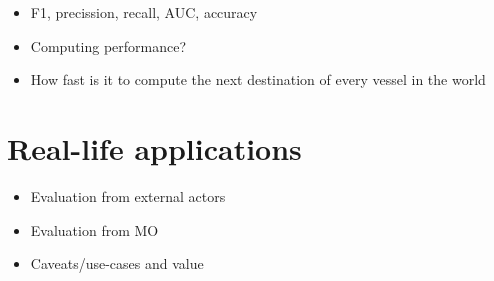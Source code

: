 \begin{itemize}
    \item F1, precission, recall, AUC, accuracy
    \item Computing performance?
    \item How fast is it to compute the next destination of every vessel in the world
\end{itemize}

\section{Real-life applications}

\begin{itemize}
    \item Evaluation from external actors
    \item Evaluation from MO
    \item Caveats/use-cases and value
\end{itemize}
